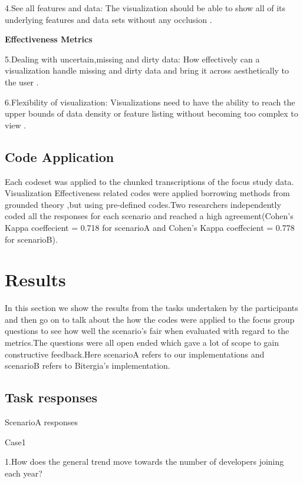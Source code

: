 \documentclass[seploa]{beavtex}
\begin{document}
4.See all features and data: The visualization should be able to show all of its underlying features and data sets without any occlusion \cite{grins2001}.

\textbf{Effectiveness Metrics}

5.Dealing with uncertain,missing and dirty data: How effectively can a visualization handle missing and dirty data and bring it across aesthetically to the user \cite{grins2001}.

6.Flexibility of visualization: Visualizations need to have the ability to reach the upper bounds of data density or feature listing without becoming too complex to view \cite{grins2001}.

\section{Code Application}
Each codeset was applied to the chunked transcriptions of the focus study data. Visualization Effectiveness related  codes  were  applied borrowing methods from  grounded theory \cite{corbin2008},but using pre-­defined codes.Two researchers independently coded all the responses for each scenario and reached a high agreement(Cohen’s  Kappa  coeffecient  =  0.718 for scenarioA and Cohen’s  Kappa  coeffecient  =  0.778 for scenarioB).

\chapter{Results}
In this section we show the results from the tasks undertaken by the participants and then go on to talk about the how the codes were applied to the focus group questions to see how well the scenario's fair when evaluated with regard to the metrics.The questions were all open ended which gave a lot of scope to gain constructive feedback.Here scenarioA refers to our implementations and scenarioB refers to Bitergia's implementation.

\section{Task responses}

ScenarioA responses

Case1

1.How does the general trend move towards the number of developers joining each year?
\end{document}
